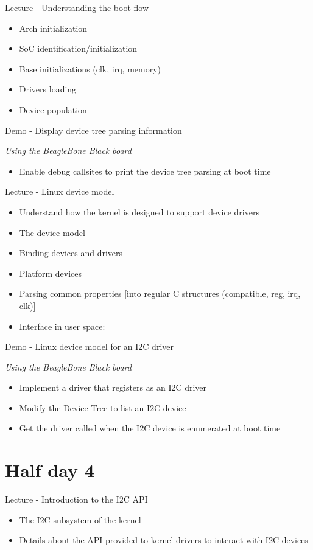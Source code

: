 \documentclass[a4paper,12pt,obeyspaces,spaces,hyphens]{article}
\begin{document}
\feagendatwocolumn
{Lecture - Understanding the boot flow}
{
  \begin{itemize}
  \item Arch initialization
  \item SoC identification/initialization
  \item Base initializations (clk, irq, memory)
  \item Drivers loading
  \item Device population
  \end{itemize}
}
{Demo - Display device tree parsing information}
{
  {\em Using the BeagleBone Black board}
  \begin{itemize}
  \item Enable debug callsites to print the device tree parsing at boot time
  \end{itemize}
}

\feagendatwocolumn
{Lecture - Linux device model}
{
  \begin{itemize}
  \item Understand how the kernel is designed to support device
    drivers
  \item The device model
  \item Binding devices and drivers
  \item Platform devices
  \item Parsing common properties
    [into regular C structures (compatible, reg, irq, clk)]
  \item Interface in user space: 
  \end{itemize}
}
{Demo - Linux device model for an I2C driver}
{
  {\em Using the BeagleBone Black board}
  \begin{itemize}
  \item Implement a driver that registers as an I2C driver
  \item Modify the Device Tree to list an I2C device
  \item Get the driver called when the I2C device is enumerated at
    boot time
  \end{itemize}
}

\section{Half day 4}

\feagendaonecolumn
{Lecture - Introduction to the I2C API}
{
  \begin{itemize}
  \item The I2C subsystem of the kernel
  \item Details about the API provided to kernel drivers to interact
    with I2C devices
  \end{itemize}
}
\end{document}
